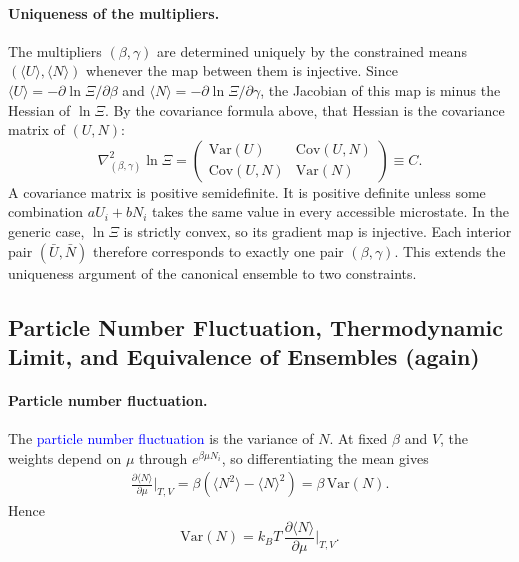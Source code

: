 \paragraph{Uniqueness of the multipliers.}
The multipliers $(\beta,\gamma)$ are determined uniquely by the constrained
means $(\langle U\rangle,\langle N\rangle)$ whenever the map between them is
injective. Since $\langle U\rangle=-\partial\ln\Xi/\partial\beta$ and
$\langle N\rangle=-\partial\ln\Xi/\partial\gamma$, the Jacobian of this map is
minus the Hessian of $\ln\Xi$. By the covariance formula above, that Hessian
is the covariance matrix of $(U,N)$:
\begin{equation}
    \boxed{\nabla^2_{(\beta,\gamma)}\ln\Xi
    =\begin{pmatrix}\mathrm{Var}(U)&\mathrm{Cov}(U,N)\\
    \mathrm{Cov}(U,N)&\mathrm{Var}(N)\end{pmatrix}\equiv C.}
\end{equation}
A covariance matrix is positive semidefinite. It is positive definite unless
some combination $aU_i+bN_i$ takes the same value in every accessible
microstate. In the generic case, $\ln\Xi$ is strictly convex, so its gradient
map is injective. Each interior pair $(\bar U,\bar N)$ therefore corresponds to
exactly one pair $(\beta,\gamma)$. This extends the uniqueness argument of the
canonical ensemble to two constraints.

\subsection{Particle Number Fluctuation, Thermodynamic Limit, and Equivalence of Ensembles (again)}

\paragraph{Particle number fluctuation.}
The \textcolor{blue}{particle number fluctuation} is the variance of $N$. At
fixed $\beta$ and $V$, the weights depend on $\mu$ through $e^{\beta\mu N_i}$,
so differentiating the mean gives
\begin{align*}
    \frac{\partial\langle N\rangle}{\partial\mu}\bigg|_{T,V}
    =\beta\left(\langle N^2\rangle-\langle N\rangle^2\right)
    =\beta\,\mathrm{Var}(N).
\end{align*}
Hence
\begin{equation}
    \boxed{\mathrm{Var}(N)=k_BT\,\frac{\partial\langle N\rangle}{\partial\mu}\bigg|_{T,V}.}
\end{equation}

